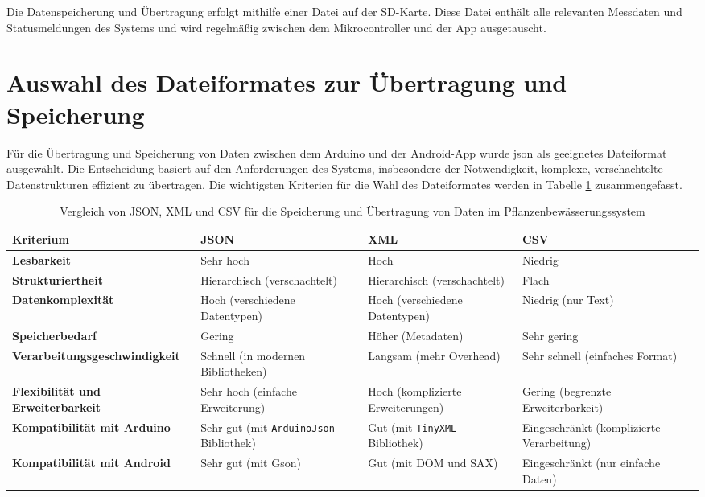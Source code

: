 Die Datenspeicherung und Übertragung erfolgt mithilfe einer Datei auf der SD-Karte. Diese Datei enthält alle relevanten Messdaten und Statusmeldungen des Systems und wird regelmäßig zwischen dem Mikrocontroller und der App ausgetauscht.


\section{Auswahl des Dateiformates zur Übertragung und Speicherung}

Für die Übertragung und Speicherung von Daten zwischen dem Arduino und der Android-App wurde \ac{json} als geeignetes Dateiformat ausgewählt. Die Entscheidung basiert auf den Anforderungen des Systems, insbesondere der Notwendigkeit, komplexe, verschachtelte Datenstrukturen effizient zu übertragen. Die wichtigsten Kriterien für die Wahl des Dateiformates werden in Tabelle \ref{tab:dateiformate} zusammengefasst.

\begin{table}[h]
	\centering
	\begin{tabularx}{\textwidth}{|X|X|X|X|} 
		\hline
		\textbf{Kriterium} & \textbf{JSON} & \textbf{XML} & \textbf{CSV} \\ 
		\hline
		\textbf{Lesbarkeit} & Sehr hoch & Hoch & Niedrig \\ 
		\hline
		\textbf{Strukturiertheit} & Hierarchisch (verschachtelt) & Hierarchisch (verschachtelt) & Flach \\ 
		\hline
		\textbf{Datenkomplexität} & Hoch (verschiedene Datentypen) & Hoch (verschiedene Datentypen) & Niedrig (nur Text) \\ 
		\hline
		\textbf{Speicherbedarf} & Gering & Höher (Metadaten) & Sehr gering \\ 
		\hline
		\textbf{Verarbeitungs\-geschwindigkeit} & Schnell (in modernen Bibliotheken) & Langsam (mehr Overhead) & Sehr schnell (einfaches Format) \\ 
		\hline
		\textbf{Flexibilität und Erweiterbarkeit} & Sehr hoch (einfache Erweiterung) & Hoch (komplizierte Erweiterungen) & Gering (begrenzte Erweiterbarkeit) \\ 
		\hline
		\textbf{Kompatibilität mit Arduino} & Sehr gut (mit \texttt{ArduinoJson}-Bibliothek) & Gut (mit \texttt{TinyXML}-Bibliothek) & Eingeschränkt (komplizierte Verarbeitung) \\ 
		\hline
		\textbf{Kompatibilität mit Android} & Sehr gut (mit Gson) & Gut (mit DOM und SAX) & Eingeschränkt (nur einfache Daten) \\ 
		\hline
	\end{tabularx}
	\caption{Vergleich von JSON, XML und CSV für die Speicherung und Übertragung von Daten im Pflanzenbewässerungssystem}
	\label{tab:dateiformate}
\end{table}


